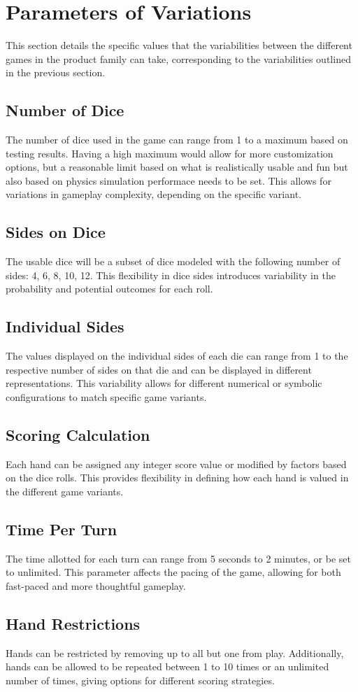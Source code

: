 \section{Parameters of Variations}

This section details the specific values that the variabilities between the different games in the product family can take, corresponding to the variabilities outlined in the previous section.

\subsection{Number of Dice}
The number of dice used in the game can range from 1 to a maximum based on testing results. Having a high maximum would allow for more customization options, but a reasonable limit based on what is realistically usable and fun but also based on physics simulation performace needs to be set. This allows for variations in gameplay complexity, depending on the specific variant.

\subsection{Sides on Dice}
The usable dice will be a subset of dice modeled with the following number of sides: 4, 6, 8, 10, 12. This flexibility in dice sides introduces variability in the probability and potential outcomes for each roll.

\subsection{Individual Sides}
The values displayed on the individual sides of each die can range from 1 to the respective number of sides on that die and can be displayed in different representations. This variability allows for different numerical or symbolic configurations to match specific game variants.

\subsection{Scoring Calculation}
Each hand can be assigned any integer score value or modified by factors based on the dice rolls. This provides flexibility in defining how each hand is valued in the different game variants.

\subsection{Time Per Turn}
The time allotted for each turn can range from 5 seconds to 2 minutes, or be set to unlimited. This parameter affects the pacing of the game, allowing for both fast-paced and more thoughtful gameplay.

\subsection{Hand Restrictions}
Hands can be restricted by removing up to all but one from play. Additionally, hands can be allowed to be repeated between 1 to 10 times or an unlimited number of times, giving options for different scoring strategies.

